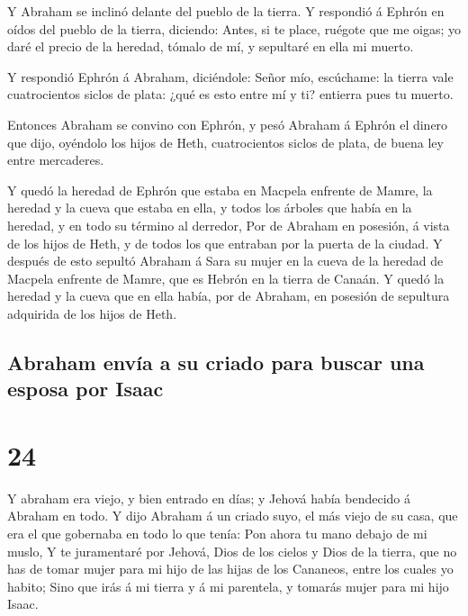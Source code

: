  Y Abraham se inclinó delante del pueblo de la tierra.
 Y respondió á Ephrón en oídos del pueblo de la tierra,
diciendo: Antes, si te place, ruégote que me oigas; yo daré el precio de
la heredad, tómalo de mí, y sepultaré en ella mi muerto.

 Y respondió Ephrón á Abraham, diciéndole: 
Señor mío, escúchame: la tierra vale cuatrocientos siclos de plata: ¿qué
es esto entre mí y ti? entierra pues tu muerto.

 Entonces Abraham se convino con Ephrón, y pesó Abraham á
Ephrón el dinero que dijo, oyéndolo los hijos de Heth, cuatrocientos
siclos de plata, de buena ley entre mercaderes.

 Y quedó la heredad de Ephrón que estaba en Macpela
enfrente de Mamre, la heredad y la cueva que estaba en ella, y todos los
árboles que había en la heredad, y en todo su término al derredor,
 Por de Abraham en posesión, á vista de los hijos de Heth,
y de todos los que entraban por la puerta de la ciudad.  Y
después de esto sepultó Abraham á Sara su mujer en la cueva de la
heredad de Macpela enfrente de Mamre, que es Hebrón en la tierra de
Canaán.  Y quedó la heredad y la cueva que en ella había,
por de Abraham, en posesión de sepultura adquirida de los hijos de Heth.

\hypertarget{abraham-envuxeda-a-su-criado-para-buscar-una-esposa-por-isaac}{%
\subsection{Abraham envía a su criado para buscar una esposa por
Isaac}\label{abraham-envuxeda-a-su-criado-para-buscar-una-esposa-por-isaac}}

\hypertarget{section-23}{%
\section{24}\label{section-23}}

 Y abraham era viejo, y bien entrado en días; y Jehová había
bendecido á Abraham en todo.  Y dijo Abraham á un criado
suyo, el más viejo de su casa, que era el que gobernaba en todo lo que
tenía: Pon ahora tu mano debajo de mi muslo,  Y te
juramentaré por Jehová, Dios de los cielos y Dios de la tierra, que no
has de tomar mujer para mi hijo de las hijas de los Cananeos, entre los
cuales yo habito;  Sino que irás á mi tierra y á mi
parentela, y tomarás mujer para mi hijo Isaac.

